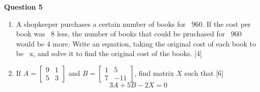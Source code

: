 \noindent
\textbf{Question 5}
\begin{enumerate}[label=(\roman*)]

    \item A shopkeeper purchases a certain number of books for \rupee~960.
        If the cost per book was \rupee~8 less, the number of books that 
        could be pruchased for \rupee~960 would be 4 more. Write an 
        equation, taking the original cost of each book to be \rupee~x, 
        and solve it to find the original cost of the books. \hfill[4]
            

    \item If $A = \begin{bmatrix*} 9 & 1 \\ 5 & 3 \end{bmatrix*}$
        and $B = \begin{bmatrix*} 1 & 5 \\ 7 & -11 \end{bmatrix*}$,
        find matrix $X$ such that \hfill [6]
        \[
            3A + 5B - 2X = 0
        \]

\end{enumerate}



